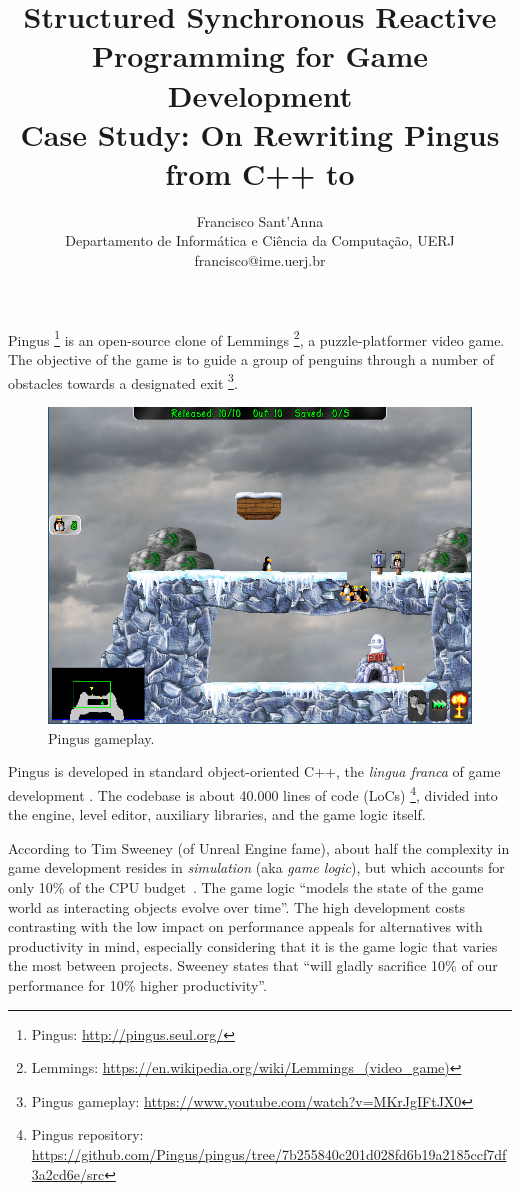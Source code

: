 \documentclass{vgtc}                          %
\title{Structured Synchronous Reactive Programming for Game Development
        \\ \Large{Case Study: On Rewriting Pingus from C++ to \CEU}}
\author{Francisco Sant'Anna
        \\ Departamento de Inform\'atica e Ci\^encia da Computa\c{c}\~ao, UERJ
        \\ francisco@ime.uerj.br}
\begin{document}

\maketitle

Pingus%
\footnote{Pingus: \url{http://pingus.seul.org/}}
is an open-source clone of Lemmings%
\footnote{Lemmings: \url{https://en.wikipedia.org/wiki/Lemmings_(video_game)}},
a puzzle-platformer video game.      
The objective of the game is to guide a group of penguins through a number of
obstacles towards a designated exit%
\footnote{Pingus gameplay: \url{https://www.youtube.com/watch?v=MKrJgIFtJX0}}.

\begin{figure}
\centering
\includegraphics[width=\columnwidth]{pingus}
\caption{Pingus gameplay.
\label{fig.sweeney}
}
\end{figure}

Pingus is developed in standard object-oriented C++, the \emph{lingua franca}
of game development \cite{games.patterns}.
The codebase is about 40.000 lines of code (LoCs)%
\footnote{Pingus repository: \url{https://github.com/Pingus/pingus/tree/7b255840c201d028fd6b19a2185ccf7df3a2cd6e/src}}, divided into
the engine, level editor, auxiliary libraries, and the game logic itself.

According to Tim Sweeney (of Unreal Engine fame), about half the complexity in
game development resides in \emph{simulation} (aka \emph{game logic}), but
which accounts for only 10\% of the CPU budget~\cite{games.sweeney}.
The game logic ``models the state of the game world as interacting objects
evolve over time''.
The high development costs contrasting with the low impact on performance
appeals for alternatives with productivity in mind, especially considering that
it is the game logic that varies the most between projects.
Sweeney states that ``will gladly sacrifice 10\% of our performance for 10\%
higher productivity''.
\end{document}

